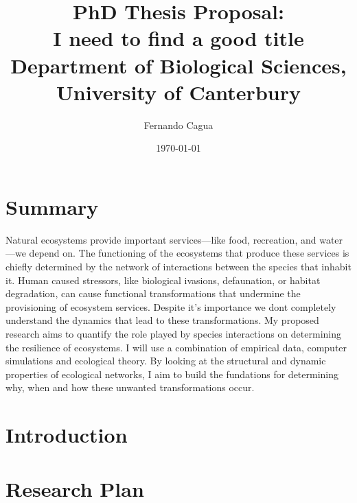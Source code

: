 \documentclass[a4paper]{report}
\title{
	{\large PhD Thesis Proposal:} \\
	{\huge \textbf{I need to find a good title}} \\
	{\large Department of Biological Sciences, University of Canterbury}
}
\author{
  {\Large Fernando Cagua} \\
}
\date{\normalsize \today}
\begin{document}
\maketitle


\chapter*{Summary}

Natural ecosystems provide important services---like food, recreation, and water---we depend on. 
The functioning of the ecosystems that produce these services is chiefly determined by the network of interactions between the species that inhabit it. 
Human caused stressors, like biological ivasions, defaunation, or habitat degradation, can cause functional transformations that undermine the provisioning of ecosystem services. 
Despite it's importance we dont completely understand the dynamics that lead to these transformations.
My proposed research aims to quantify the role played by species interactions on determining the resilience of ecosystems.
I will use a combination of empirical data, computer simulations and ecological theory. 
By looking at the structural and dynamic properties of ecological networks, I aim to build the fundations for determining why, when and how these unwanted transformations occur. 

\tableofcontents

\chapter*{Introduction}


\chapter*{Research Plan}
\end{document}
